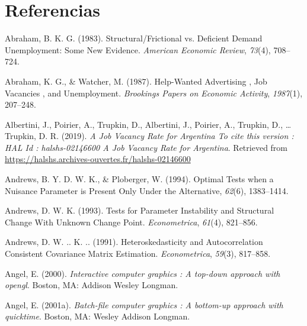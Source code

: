 \documentclass[12pt,oneside]{reedthesis}
\begin{document}
\hypertarget{referencias}{%
\chapter*{Referencias}\label{referencias}}


\noindent

\setlength{\parindent}{-0.20in}
\setlength{\leftskip}{0.20in}
\setlength{\parskip}{8pt}

\hypertarget{refs}{}
\leavevmode\hypertarget{ref-Abraham1983}{}%
Abraham, B. K. G. (1983). Structural/Frictional vs. Deficient Demand Unemployment: Some New Evidence. \emph{American Economic Review}, \emph{73}(4), 708--724.

\leavevmode\hypertarget{ref-Abraham1987}{}%
Abraham, K. G., \& Watcher, M. (1987). Help-Wanted Advertising , Job Vacancies , and Unemployment. \emph{Brookings Papers on Economic Activity}, \emph{1987}(1), 207--248.

\leavevmode\hypertarget{ref-ArgentinaBC2019}{}%
Albertini, J., Poirier, A., Trupkin, D., Albertini, J., Poirier, A., Trupkin, D., \ldots{} Trupkin, D. R. (2019). \emph{A Job Vacancy Rate for Argentina To cite this version : HAL Id : halshs-02146600 A Job Vacancy Rate for Argentina}. Retrieved from \url{https://halshs.archives-ouvertes.fr/halshs-02146600}

\leavevmode\hypertarget{ref-Andrews1994}{}%
Andrews, B. Y. D. W. K., \& Ploberger, W. (1994). Optimal Tests when a Nuisance Parameter is Present Only Under the Alternative, \emph{62}(6), 1383--1414.

\leavevmode\hypertarget{ref-Andrews1993}{}%
Andrews, D. W. K. (1993). Tests for Parameter Instability and Structural Change With Unknown Change Point. \emph{Econometrica}, \emph{61}(4), 821--856.

\leavevmode\hypertarget{ref-Andrews1991}{}%
Andrews, D. W. .. K. .. (1991). Heteroskedasticity and Autocorrelation Consistent Covariance Matrix Estimation. \emph{Econometrica}, \emph{59}(3), 817--858.

\leavevmode\hypertarget{ref-angel2000}{}%
Angel, E. (2000). \emph{Interactive computer graphics : A top-down approach with opengl}. Boston, MA: Addison Wesley Longman.

\leavevmode\hypertarget{ref-angel2001}{}%
Angel, E. (2001a). \emph{Batch-file computer graphics : A bottom-up approach with quicktime}. Boston, MA: Wesley Addison Longman.
\end{document}
